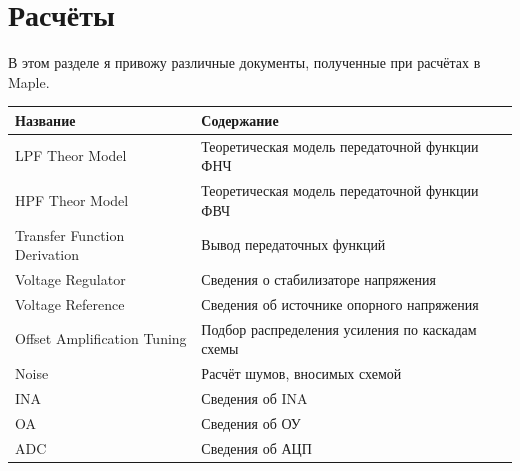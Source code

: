 \documentclass[a4paper, 10pt, final]{article} %
\begin{document}
    \section{Расчёты} \label{sec:Calculations}
    В этом разделе я привожу различные документы, полученные при расчётах в Maple.
    \begin{center}
        \begin{tabular}{ ||l|l|| }
            \hline
            \multicolumn{1}{||l|}{Название} & \multicolumn{1}{|l||}{Содержание} \\
            \hline
            \hline
            LPF Theor Model & Теоретическая модель передаточной функции ФНЧ \\
            HPF Theor Model & Теоретическая модель передаточной функции ФВЧ \\
            Transfer Function Derivation & Вывод передаточных функций \\
            Voltage Regulator & Сведения о стабилизаторе напряжения \\
            Voltage Reference & Сведения об источнике опорного напряжения \\
            Offset Amplification Tuning & Подбор распределения усиления по каскадам схемы \\
            Noise & Расчёт шумов, вносимых схемой \\
            INA & Сведения об INA \\
            OA & Сведения об ОУ \\
            ADC & Сведения об АЦП \\
            \hline
        \end{tabular}
    \end{center}

    
    
    
    
    
    
    
    
    
    

    \printbibheading
    \printbibliography[keyword=major, heading=subbibliography, title={Основные источники}]
    \printbibliography[keyword=minor, heading=subbibliography, title={Второстепенные источники}]
    \printbibliography[keyword=data, heading=subbibliography, title={Источники данных}]
    \printbibliography[keyword=image, heading=subbibliography, title={Источники изображений}]
    \printbibliography[keyword=datasheet, heading=subbibliography, title={Техническая документация}]
    \printbibliography[keyword=software, heading=subbibliography, title={Программное обеспечение}]
    \printbibliography[keyword=web, heading=subbibliography, title={Источники компонентов}]
\end{document}
